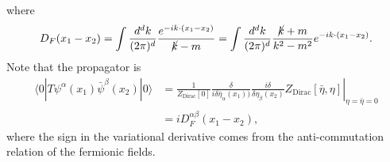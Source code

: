 where
\begin{equation}
	D_F(x_1-x_2) = \int \frac{d^d k}{(2\pi)^d} \frac{e^{-i k \cdot (x_1-x_2)}}{\cancel{k}-m}
	= \int \frac{d^d k}{(2\pi)^d} \frac{\cancel{k}+m}{k^2-m^2} e^{-i k \cdot (x_1-x_2)}.
\end{equation}
Note that the propagator is
\begin{equation}
\begin{aligned}
	\langle 0| T \psi^\alpha(x_1) \bar\psi^\beta(x_2) |0\rangle
	&= \left.\frac{1}{Z_{\mathrm{Dirac}}[0]}\frac{\delta}{i\delta \bar{\eta}_\alpha(x_1))}\frac{i\delta}{\delta\eta_\beta(x_2)} Z_{\mathrm{Dirac}}[\bar\eta,\eta]\right|_{\eta=\bar\eta=0} \\
	&= i D^{\alpha\beta}_F(x_1-x_2),
\end{aligned}
\end{equation}
where the sign in the variational derivative comes from the anti-commutation relation of the fermionic fields.




